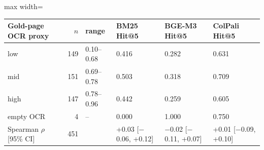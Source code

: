 \begin{adjustbox}{max width=\linewidth}
\begin{tabular}{lrllll}
\toprule
Gold-page OCR proxy & $n$ & range & BM25 Hit@5 & BGE-M3 Hit@5 & ColPali Hit@5 \\
\midrule
low & 149 & 0.10--0.68 & 0.416 & 0.282 & 0.631 \\
mid & 151 & 0.69--0.78 & 0.503 & 0.318 & 0.709 \\
high & 147 & 0.78--0.96 & 0.442 & 0.259 & 0.605 \\
empty OCR & 4 & -- & 0.000 & 1.000 & 0.750 \\
\midrule Spearman $\rho$ [95\% CI] & 451 & & +0.03 [$-$0.06, +0.12] & $-$0.02 [$-$0.11, +0.07] & +0.01 [$-$0.09, +0.10] \\
\bottomrule
\end{tabular}
\end{adjustbox}
\par{}
